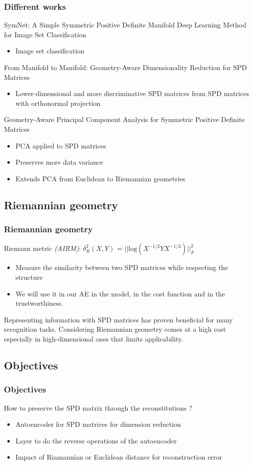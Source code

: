\documentclass{beamer}
\begin{document}
\begin{frame}
    \frametitle{Different works}
    SymNet: A Simple Symmetric Positive Definite Manifold Deep Learning Method for Image Set Classification \cite{9390301}
    \begin{itemize}
        \item Image set classification
    \end{itemize}
    From Manifold to Manifold: Geometry-Aware Dimensionality Reduction for SPD Matrices \cite{harandi2014manifoldmanifoldgeometryawaredimensionality}
    \begin{itemize}
        \item Lower-dimensional and more discriminative SPD matrices from SPD matrices with orthonormal projection
    \end{itemize}
    Geometry-Aware Principal Component Analysis for Symmetric Positive Definite Matrices \cite{articlepcaaspd}
    \begin{itemize}
        \item PCA applied to SPD matrices
        \item Preserves more data variance
        \item Extends PCA from Euclidean to Riemannian geometries
    \end{itemize}
\end{frame}
\subsection{Riemannian geometry}
\begin{frame}
    \frametitle{Riemannian geometry}
    Riemann metric \textit{(AIRM)}: $\delta^2_R(X,Y)$ = $||\text{log}(X^{-1/2}YX^{-1/2})||^2_F$
    \begin{itemize}
        \item Measure the similarity between two SPD matrices while respecting the structure
        \item We will use it in our AE in the model, in the cost function and in the trustworthiness.
    \end{itemize}
    Representing information with SPD matrices has proven beneficial for many recognition tasks. 
    Considering Riemannian geometry comes at a high cost especially in high-dimensional ones that limits applicability.
\end{frame}
\subsection{Objectives}
\begin{frame}
\frametitle{Objectives}
How to preserve the SPD matrix through the reconstitutions ?
\begin{itemize}
    \item Autoencoder for SPD matrices for dimension reduction
    \item Layer to do the reverse operations of the autoencoder
    \item Impact of Riamannian or Euclidean distance for reconstruction error
\end{itemize}
\end{frame}
\end{document}

